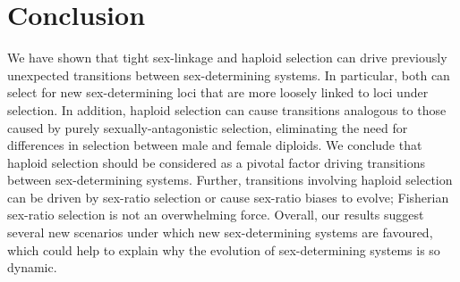 \documentclass[10pt,letterpaper]{article}
\begin{document}

\section*{Conclusion}

We have shown that tight sex-linkage and haploid selection can drive previously unexpected transitions between sex-determining systems.
In particular, both can select for new sex-determining loci that are more loosely linked to loci under selection. 
In addition, haploid selection can cause transitions analogous to those caused by purely sexually-antagonistic selection, eliminating the need for differences in selection between male and female diploids.
We conclude that haploid selection should be considered as a pivotal factor driving transitions between sex-determining systems. 
Further, transitions involving haploid selection can be driven by sex-ratio selection or cause sex-ratio biases to evolve; Fisherian sex-ratio selection is not an overwhelming force. 
Overall, our results suggest several new scenarios under which new sex-determining systems are favoured, which could help to explain why the evolution of sex-determining systems is so dynamic. 
\end{document}
